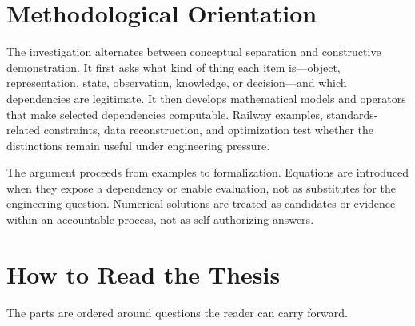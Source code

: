 \section{Methodological Orientation}

The investigation alternates between conceptual separation and constructive
demonstration. It first asks what kind of thing each item is---object,
representation, state, observation, knowledge, or decision---and which
dependencies are legitimate. It then develops mathematical models and
operators that make selected dependencies computable. Railway examples,
standards-related constraints, data reconstruction, and optimization test
whether the distinctions remain useful under engineering pressure.

The argument proceeds from examples to formalization. Equations are introduced
when they expose a dependency or enable evaluation, not as substitutes for the
engineering question. Numerical solutions are treated as candidates or
evidence within an accountable process, not as self-authorizing answers.

\section{How to Read the Thesis}

The parts are ordered around questions the reader can carry forward.

